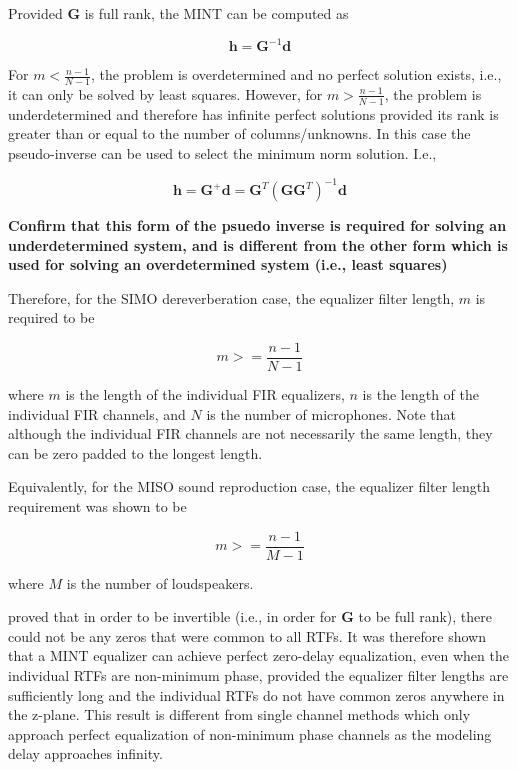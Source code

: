 \noindent
Provided $\boldsymbol{G}$ is full rank, the MINT can be computed as

\begin{equation}
	\boldsymbol{h} = \boldsymbol{G}^{-1}\boldsymbol{d}
\end{equation}

For $m < \frac{n-1}{N-1}$, the problem is overdetermined and no perfect solution exists, i.e., it can only be solved by least squares. However, for $m > \frac{n-1}{N-1}$, the problem is underdetermined and therefore has infinite perfect solutions provided its rank is greater than or equal to the number of columns/unknowns. In this case the pseudo-inverse can be used to select the minimum norm solution. I.e.,

\begin{equation}
	\boldsymbol{h} = \boldsymbol{G}^+\boldsymbol{d} = \boldsymbol{G}^T(\boldsymbol{G}\boldsymbol{G}^T)^{-1}\boldsymbol{d}
\end{equation}

\textbf{Confirm that this form of the psuedo inverse is required for solving an underdetermined system, and is different from the other form which is used for solving an overdetermined system (i.e., least squares)}

 Therefore, for the SIMO dereverberation case, the equalizer filter length, $m$ is required to be

\begin{equation}
	m >= \frac{n-1}{N-1}
\end{equation}

\noindent
where $m$ is the length of the individual FIR equalizers, $n$ is the length of the individual FIR channels, and $N$ is the number of microphones. Note that although the individual FIR channels are not necessarily the same length, they can be zero padded to the longest length.

Equivalently, for the MISO sound reproduction case, the equalizer filter length requirement was shown to be

\begin{equation}
	m >= \frac{n-1}{M-1}
\end{equation}

\noindent
where $M$ is the number of loudspeakers.


 \cite{miyoshi1986inverse} proved that in order to be invertible (i.e., in order for $\boldsymbol{G}$ to be full rank), there could not be any zeros that were common to all RTFs. It was therefore shown that a MINT equalizer can achieve perfect zero-delay equalization, even when the individual RTFs are non-minimum phase, provided the equalizer filter lengths are sufficiently long and the individual RTFs do not have common zeros anywhere in the z-plane. This result is different from single channel methods which only approach perfect equalization of non-minimum phase channels as the modeling delay approaches infinity. 
 
